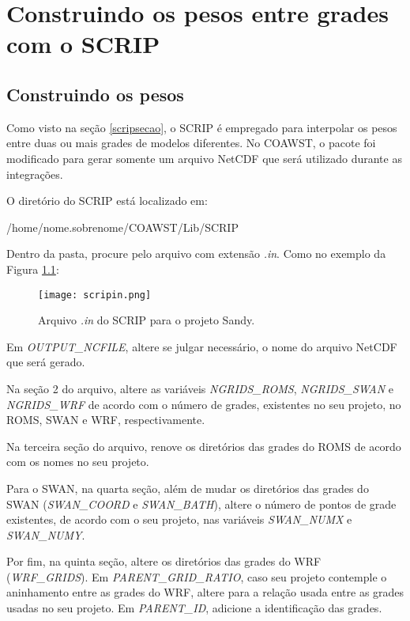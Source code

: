 \chapter{Construindo os pesos entre grades com o SCRIP}
\bigskip
\section{Construindo os pesos}
\bigskip
\noindent Como visto na seção \textcolor{bleu_cite}{\ref{scripsecao}}, o SCRIP é empregado para interpolar os pesos entre duas ou mais grades de modelos diferentes. No COAWST, o pacote foi modificado para gerar somente um arquivo NetCDF que será utilizado durante as integrações.
\bigskip

\noindent O diretório do SCRIP está localizado em:
\bigskip

\begin{bashcode}
/home/nome.sobrenome/COAWST/Lib/SCRIP
\end{bashcode}
\bigskip

\noindent Dentro da pasta, procure pelo arquivo com extensão \textit{.in}. Como no exemplo da Figura \textcolor{bleu_cite}{\ref{scripinnedit}}:

\begin{figure}[H]
    \centering
    \texttt{[image: scripin.png]}
    \caption{Arquivo \textit{.in} do SCRIP para o projeto Sandy.}
    \label{scripinnedit}
\end{figure}
\bigskip

\noindent Em \textit{OUTPUT\_NCFILE}, altere se julgar necessário, o nome do arquivo NetCDF que será gerado.
\bigskip

\noindent Na seção 2 do arquivo, altere as variáveis \textit{NGRIDS\_ROMS}, \textit{NGRIDS\_SWAN} e \textit{NGRIDS\_WRF} de acordo com o número de grades, existentes no seu projeto, no ROMS, SWAN e WRF, respectivamente.
\bigskip

\noindent Na terceira seção do arquivo, renove os diretórios das grades do ROMS de acordo com os nomes no seu projeto.
\bigskip

\noindent Para o SWAN, na quarta seção, além de mudar os diretórios das grades do SWAN (\textit{SWAN\_COORD} e \textit{SWAN\_BATH}), altere o número de pontos de grade existentes, de acordo com o seu projeto, nas variáveis \textit{SWAN\_NUMX} e \textit{SWAN\_NUMY}.
\bigskip

\noindent Por fim, na quinta seção, altere os diretórios das grades do WRF (\textit{WRF\_GRIDS}). Em \textit{PARENT\_GRID\_RATIO}, caso seu projeto contemple o aninhamento entre as grades do WRF, altere para a relação usada entre as grades usadas no seu projeto. Em \textit{PARENT\_ID}, adicione a identificação das grades.
\bigskip


